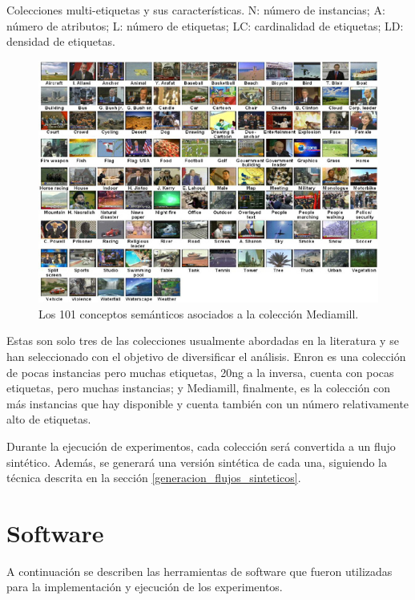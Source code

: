 \begin{table}[htbp]
	\centering
	
	\caption[Colecciones multi-etiquetas y sus características.]{Colecciones multi-etiquetas y sus características. N: número de
		instancias; A: número de atributos; L: número de etiquetas; LC: cardinalidad
		de etiquetas; LD: densidad de etiquetas.}
	\label{tab:datasets}
\end{table}

\begin{figure}
	\includegraphics[width=.9\linewidth]{figures/mediamill.jpg}
	\centering
	\caption{Los 101 conceptos semánticos asociados a la colección
		Mediamill.}
	\label{fig:mediamill}
\end{figure}

Estas son solo tres de las colecciones usualmente abordadas en la literatura y
se han seleccionado con el objetivo de diversificar el análisis. Enron es una
colección de pocas instancias pero muchas etiquetas, 20ng a la inversa, cuenta
con pocas etiquetas, pero muchas instancias; y Mediamill, finalmente, es la
colección con más instancias que hay disponible y cuenta también con un número
relativamente alto de etiquetas.

Durante la ejecución de experimentos, cada colección será convertida a un flujo
sintético. Además, se generará una versión sintética de cada una, siguiendo la
técnica descrita en la sección \ref{generacion_flujos_sinteticos}.

\section{Software}

A continuación se describen las herramientas de software que fueron utilizadas
para la implementación y ejecución de los experimentos.

